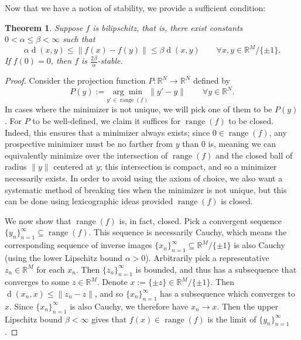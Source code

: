 \documentclass[times,10pt]{elsarticle}
\theoremstyle{plain}
\newtheorem{theorem}{Theorem}
\begin{document}
Now that we have a notion of stability, we provide a sufficient condition:

\begin{theorem}
\label{thm.bilipschitz}
Suppose $f$ is bilipschitz, that is, there exist constants $0<\alpha\leq\beta<\infty$ such that
\begin{equation*}
\alpha\operatorname{d}(x,y)
\leq\|f(x)-f(y)\|
\leq\beta\operatorname{d}(x,y)
\qquad
\forall x,y\in\mathbb{R}^M/\{\pm1\}.
\end{equation*}
If $f(0)=0$, then $f$ is $\frac{2\beta}{\alpha}$-stable.
\end{theorem}


\begin{proof}
Consider the projection function $P\colon\mathbb{R}^N\rightarrow\mathbb{R}^N$ defined by
\begin{equation*}
P(y)
:=\underset{y'\in\operatorname{range}(f)}{\arg\min}\|y'-y\|
\qquad
\forall
y\in\mathbb{R}^N.
\end{equation*}
In cases where the minimizer is not unique, we will pick one of them to be $P(y)$.
For $P$ to be well-defined, we claim it suffices for $\operatorname{range}(f)$ to be closed.
Indeed, this ensures that a minimizer always exists; since $0\in\operatorname{range}(f)$, any prospective minimizer must be no farther from $y$ than $0$ is, meaning we can equivalently minimize over the intersection of $\operatorname{range}(f)$ and the closed ball of radius $\|y\|$ centered at $y$; this intersection is compact, and so a minimizer necessarily exists.
In order to avoid using the axiom of choice, we also want a systematic method of breaking ties when the minimizer is not unique, but this can be done using lexicographic ideas provided $\operatorname{range}(f)$ is closed.

We now show that $\operatorname{range}(f)$ is, in fact, closed.
Pick a convergent sequence $\{y_n\}_{n=1}^\infty\subseteq\operatorname{range}(f)$.
This sequence is necessarily Cauchy, which means the corresponding sequence of inverse images $\{x_n\}_{n=1}^\infty\subseteq\mathbb{R}^M/\{\pm1\}$ is also Cauchy (using the lower Lipschitz bound $\alpha>0$).
Arbitrarily pick a representative $z_n\in\mathbb{R}^M$ for each $x_n$.
Then $\{z_n\}_{n=1}^\infty$ is bounded, and thus has a subsequence that converges to some $z\in\mathbb{R}^M$.
Denote $x:=\{\pm z\}\in\mathbb{R}^M/\{\pm1\}$.
Then $\operatorname{d}(x_n,x)\leq\|z_n-z\|$, and so $\{x_n\}_{n=1}^\infty$ has a subsequence which converges to $x$.
Since $\{x_n\}_{n=1}^\infty$ is also Cauchy, we therefore have $x_n\rightarrow x$.
Then the upper Lipschitz bound $\beta<\infty$ gives that $f(x)\in\operatorname{range}(f)$ is the limit of $\{y_n\}_{n=1}^\infty$.


\end{proof}
\end{document}
